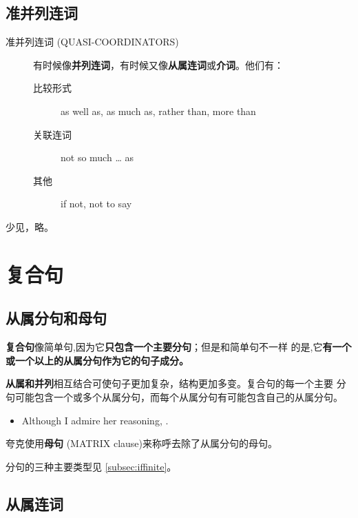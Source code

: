 \subsection{准并列连词}
\label{subsec:quasicoor}

\begin{description}
\item[准并列连词 (QUASI-COORDINATORS)]  有时候像\textbf{并列连词}，有时候又像\textbf{从属连词}或\textbf{介词}。他们有：
  \begin{description}
  \item[比较形式] as well as, as much as, rather than, more than

  \item[关联连词] not so much \ldots{} as
  \item[其他] if not, not to say
  \end{description}
\end{description}

少见，略。

\section{复合句}

\subsection{从属分句和母句}

\textbf{复合句}像简单句,因为它\textbf{只包含一个主要分句}；但是和简单句不一样
的是,它\textbf{有一个或一个以上的从属分句作为它的句子成分。}

\textbf{从属和并列}相互结合可使句子更加复杂，结构更加多变。复合句的每一个主要
分句可能包含一个或多个从属分句，而每个从属分句有可能包含自己的从属分句。

\begin{itemize}
\item Although I admire her reasoning, .
\end{itemize}

夸克使用\textbf{母句} (MATRIX clause)来称呼去除了从属分句的母句。

分句的三种主要类型见 \cref{subsec:iffinite}。

\subsection{从属连词}
\label{subsec:subcon}

